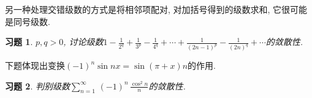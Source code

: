 \documentclass[11pt,a4paper]{ctexart}
\makeatletter
\theoremstyle{thmseries} %
\theoremstyle{exerseries}
\newtheorem{exer}{习题}[section]
\renewenvironment{proof}[1][\proofname]{\par
  \pushQED{\qed}%
  \normalfont \topsep6\p@\@plus6\p@\relax
  \trivlist
  \item[\hskip\labelsep
        \itshape
    #1\@addpunct{}]\ignorespaces
}{%
  \popQED\endtrivlist\@endpefalse
}
\newenvironment{pf}{\begin{proof}[\bfseries\upshape 证\quad]}{\end{proof}}
\newcommand{\bra}[1]{\mathopen{}\left(#1\right)}
\newcommand{\sbra}[1]{\mathopen{}\left[#1\right]}
\def \tseries {{\textstyle\sum\limits_{n=1}^{\infty}}\,} %
\def \dseries {\sum_{n=1}^{\infty}\,} %
\makeatother
\begin{document}

另一种处理交错级数的方式是将相邻项配对, 对加括号得到的级数求和, 它很可能是同号级数. 

\begin{exer}
	$p,q>0$, 讨论级数$1-\frac{1}{2^q}+\frac{1}{3^p}-\frac{1}{4^q}+\cdots+\frac{1}{(2n-1)^p}-\frac{1}{(2n)^q}+\cdots$的敛散性. 
\end{exer}

下题体现出变换$(-1)^n\sin nx=\sin(\pi+x)n$的作用. 
\begin{exer}
	判别级数$\tseries(-1)^n\,\frac{\cos^2n}{n}$的敛散性. 
\end{exer}

\end{document}
